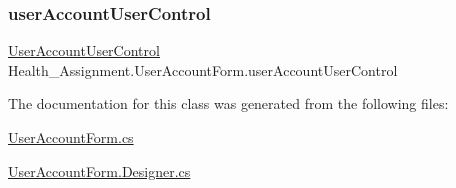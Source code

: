 \subsubsection{\texorpdfstring{user\+Account\+User\+Control}{userAccountUserControl}}
{\footnotesize\ttfamily \hyperlink{class_health___assignment_1_1_user_account_user_control}{User\+Account\+User\+Control} Health\+\_\+\+Assignment.\+User\+Account\+Form.\+user\+Account\+User\+Control}



The documentation for this class was generated from the following files\+:\begin{DoxyCompactItemize}
\item 
\hyperlink{_user_account_form_8cs}{User\+Account\+Form.\+cs}\item 
\hyperlink{_user_account_form_8_designer_8cs}{User\+Account\+Form.\+Designer.\+cs}\end{DoxyCompactItemize}
